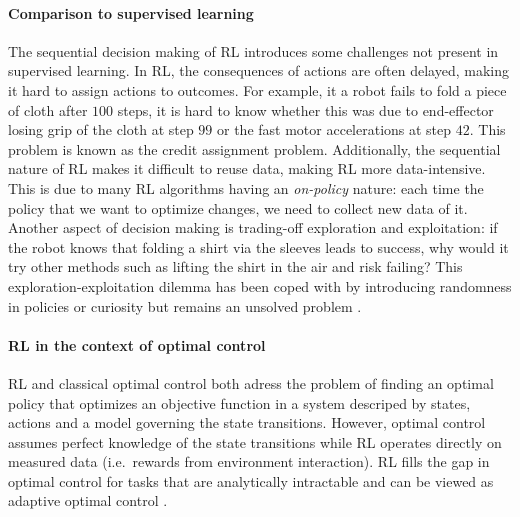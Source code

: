 \documentclass[\home/main.tex]{subfiles}
\begin{document}
\paragraph{Comparison to supervised learning}
The sequential decision making of RL introduces some challenges not present in supervised learning.
In RL, the consequences of actions are often delayed, making it hard to assign actions to outcomes. For example, it a robot fails to fold a piece of cloth after $100$ steps, it is hard to know whether this was due to end-effector losing grip of the cloth at step $99$ or the fast motor accelerations at step $42$. This problem is known as the credit assignment problem.
Additionally, the sequential nature of RL makes it difficult to reuse data, making RL more data-intensive. This is due to many RL algorithms having an \emph{on-policy} nature: each time the policy that we want to optimize changes, we need to collect new data of it.
Another aspect of decision making is trading-off exploration and exploitation: if the robot knows that folding a shirt via the sleeves leads to success, why would it try other methods such as lifting the shirt in the air and risk failing? This exploration-exploitation dilemma has been coped with by introducing randomness in policies or curiosity \autocite{pathak2017curiosity} but remains an unsolved problem \autocite{Sutton2018}.

\paragraph{RL in the context of optimal control}
\Gls{RL} and classical optimal control both adress the problem of finding an optimal policy that optimizes an objective function in a system descriped by states, actions and a model governing the state transitions. However, optimal control assumes perfect knowledge of the state transitions while RL operates directly on measured data (i.e.\ rewards from environment interaction). RL fills the gap in optimal control for tasks that are analytically intractable and can be viewed as adaptive optimal control \autocite{sutton1992reinforcement}.
\end{document}

